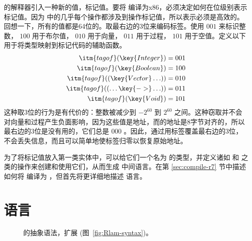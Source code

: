 \documentclass[11pt]{book}
\newcommand{\gray}[1]{{\color{gray} #1}}
\begin{document}
 \LangDyn{} 的解释器引入一种新的值，标记值。要将 \LangDyn{} 编译为x86，必须决定如何在位级别表示标记值。因为 \LangDyn{}
中的几乎每个操作都涉及到操作标记值，所以表示必须是高效的。回想一下，所有的值都是64位的。取最右边的3位来编码标签。使用 $001$ 来标识整数， $100$ 用于布尔值， $010$ 用于向量， $011$ 用于过程， $101$ 用于空值。定义以下用于将类型映射到标记代码的辅助函数。
\begin{align*}
\itm{tagof}(\key{Integer}) &= 001 \\
\itm{tagof}(\key{Boolean}) &= 100 \\
\itm{tagof}((\key{Vector} \ldots)) &= 010 \\
\itm{tagof}((\ldots \key{->} \ldots)) &= 011 \\
\itm{tagof}(\key{Void}) &= 101
\end{align*}
这种取3位的行为是有代价的：整数被减少到 $-2^{60}$ 到 $2^{60}$ 之间。这种窃取并不会对向量和过程产生负面影响，因为这些值是地址，而的地址是8字节对齐的，所以最右边的3位是没有用的，它们总是 $000$ 。因此，通过用标签覆盖最右边的3位，不会丢失信息，而且可以简单地使标签归零以恢复原始地址。

为了将标记值放入第一类实体中，可以给它们一个名为  的类型，并定义诸如 
和  之类的操作来创建和使用它们，从而生成 \LangAny{}
中间语言。在第 \ref{sec:compile-r7} 节中描述如何将 \LangDyn{} 编译为 \LangAny{} ，但首先将更详细地描述 \LangAny{} 语言。

\section{ \LangAny{} 语言}
\label{sec:Rany-lang}

\begin{figure}[tp]
\centering
\fbox{
  \begin{minipage}{0.96\textwidth}
    \small
\[
\begin{array}{lcl}
\Type &::= & \ldots \mid \key{Any} \\
\itm{op} &::= & \ldots \mid \code{any-vector-length}
     \mid \code{any-vector-ref} \mid \code{any-vector-set!}\\
    &\mid& \code{boolean?} \mid \code{integer?} \mid \code{vector?}
     \mid \code{procedure?} \mid \code{void?} \\
\Exp &::=& \ldots
     \mid \gray{ \PRIM{\itm{op}}{\Exp\ldots} } \\
    &\mid& \INJECT{\Exp}{\FType} \mid \PROJECT{\Exp}{\FType} \\
 \Def &::=& \gray{ \FUNDEF{\Var}{\LP[\Var \code{:} \Type]\ldots\RP}{\Type}{\code{'()}}{\Exp} }\\
  \LangAny{} &::=& \gray{ \PROGRAMDEFSEXP{\code{'()}}{\LP\Def\ldots\RP}{\Exp} }
\end{array}
\]
\end{minipage}
}
\caption{ \LangAny{} 的抽象语法，扩展 \LangLam{} (图~\ref{fig:Rlam-syntax})。}
\label{fig:Rany-syntax}
\end{figure}
\end{document}
